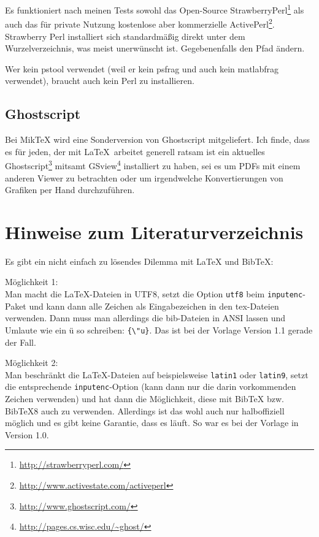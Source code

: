 Es funktioniert nach meinen Tests sowohl das Open-Source StrawberryPerl\footnote{\url{http://strawberryperl.com/}} als auch das für private Nutzung kostenlose aber kommerzielle ActivePerl\footnote{\url{http://www.activestate.com/activeperl}}. Strawberry Perl installiert sich standardmäßig direkt unter dem Wurzelverzeichnis, was meist unerwünscht ist. Gegebenenfalls den Pfad ändern.

Wer kein pstool verwendet (weil er kein psfrag und auch kein matlabfrag verwendet), braucht auch kein Perl zu installieren.

\subsection{Ghostscript}

Bei MikTeX wird eine Sonderversion von Ghostscript mitgeliefert. Ich finde, dass es für jeden, der mit \LaTeX\ arbeitet generell ratsam ist ein aktuelles Ghostscript\footnote{\url{http://www.ghostscript.com/}} mitsamt GSview\footnote{\url{http://pages.cs.wisc.edu/~ghost/}} installiert zu haben, sei es um PDFs mit einem anderen Viewer zu betrachten oder um irgendwelche Konvertierungen von Grafiken per Hand durchzuführen.

\section{Hinweise zum Literaturverzeichnis}

Es gibt ein nicht einfach zu lösendes Dilemma mit LaTeX und BibTeX:

Möglichkeit 1:\\Man macht die LaTeX-Dateien in UTF8, setzt die Option \texttt{utf8} beim \texttt{inputenc}-Paket und kann dann alle Zeichen als Eingabezeichen in den tex-Dateien verwenden. Dann muss man allerdings die bib-Dateien in ANSI lassen und Umlaute wie ein ü so schreiben: \verb+{\"u}+.
Das ist bei der Vorlage Version 1.1 gerade der Fall.

Möglichkeit 2:\\Man beschränkt die LaTeX-Dateien auf beispielsweise \texttt{latin1} oder \texttt{latin9}, setzt die entsprechende \texttt{inputenc}-Option (kann dann nur die darin vorkommenden Zeichen verwenden) und hat dann die Möglichkeit, diese mit BibTeX bzw. BibTeX8 auch zu verwenden. Allerdings ist das wohl auch nur halboffiziell möglich und es gibt keine Garantie, dass es läuft.
So war es bei der Vorlage in Version 1.0.


